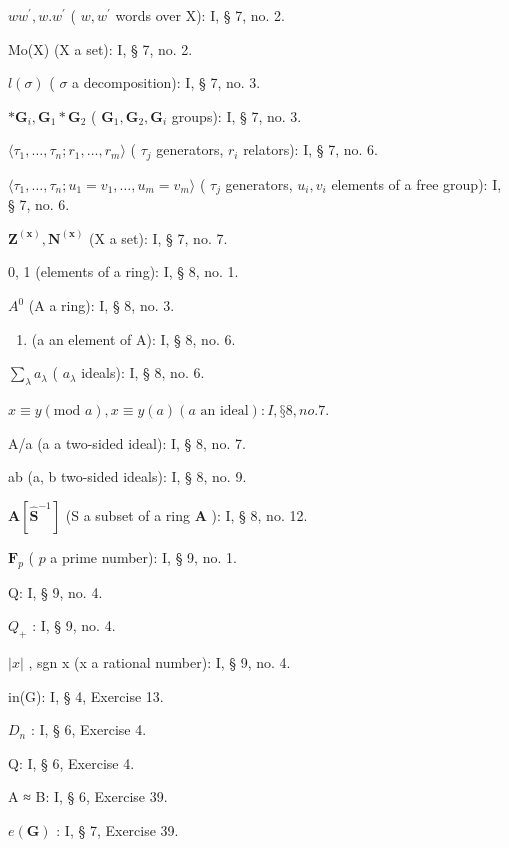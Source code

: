 \(ww^{\prime}, w.w^{\prime}\) ( \(w, w^{\prime}\) words over X): I, § 7, no. 2.

Mo(X) (X a set): I, § 7, no. 2.

\(l(\sigma)\) ( \(\sigma\) a decomposition): I, § 7, no. 3.

\(*\mathbf{G}_i,\mathbf{G}_1*\mathbf{G}_2\) ( \(\mathbf{G}_1,\mathbf{G}_2,\mathbf{G}_i\) groups): I, § 7, no. 3.

\(\langle \tau_{1},\ldots ,\tau_{n};r_{1},\ldots ,r_{m}\rangle\) ( \(\tau_{j}\) generators, \(r_i\) relators): I, § 7, no. 6.

\(\langle \tau_{1},\ldots ,\tau_{n};u_{1} = v_{1},\ldots ,u_{m} = v_{m}\rangle\) ( \(\tau_{j}\) generators, \(u_{i},v_{i}\) elements of a free group): I, § 7, no. 6.

\(\mathbf{Z}^{(\mathbf{x})}, \mathbf{N}^{(\mathbf{x})}\) (X a set): I, § 7, no. 7.

0, 1 (elements of a ring): I, § 8, no. 1.

\(A^{0}\) (A a ring): I, § 8, no. 3.

\begin{enumerate}
\def\labelenumi{(\alph{enumi})}
\tightlist
\item
  (a an element of A): I, § 8, no. 6.
\end{enumerate}

\(\sum_{\lambda} a_{\lambda}\) ( \(a_{\lambda}\) ideals): I, § 8, no. 6.

\(x \equiv y (\text{mod } a), x \equiv y (a) (a \text{ an ideal}): I, § 8, no. 7.\)

A/a (a a two-sided ideal): I, § 8, no. 7.

ab (a, b two-sided ideals): I, § 8, no. 9.

\(\mathbf{A}[\hat{\mathbf{S}}^{-1}]\) (S a subset of a ring \(\mathbf{A}\) ): I, § 8, no. 12.

\(\mathbf{F}_p\) ( \(p\) a prime number): I, § 9, no. 1.

Q: I, § 9, no. 4.

\(Q_{+}\) : I, § 9, no. 4.

\(|x|\) , sgn x (x a rational number): I, § 9, no. 4.

in(G): I, § 4, Exercise 13.

\(D_{n}\) : I, § 6, Exercise 4.

Q: I, § 6, Exercise 4.

A ≈ B: I, § 6, Exercise 39.

\(e(\mathbf{G})\) : I, § 7, Exercise 39.

